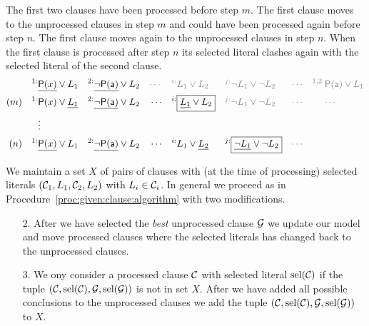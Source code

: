 \begin{example}[InstGen]
	The first two clauses have been processed before step \( m \).
	The first clause moves to the unprocessed clauses in step \( m \)
	and could have been processed again before step \( n \).
	The first clause moves again to the unprocessed clauses in step \( n \).
When the first clause is processed after step \(n \)
its selected literal clashes again with the selected literal of
the second clause.
\begin{align*}
	^{1:}&\underline{\mP(x)}\lor L_1
	&^{2:}&\underline{\lnot\mP(\ma)}\lor L_2
	&&\textcolor{colG}{\cdots}
	&\textcolor{colG}{^{i:}}&\textcolor{colG}{L_1\lor L_2}
	&\textcolor{colG}{^{j:}}&\textcolor{colG}{\lnot L_1\lor\lnot L_2}
	&&\textcolor{colG}{\cdots}
	&\textcolor{colG}{^{1,2:}}&\textcolor{colG}{\mP(\ma)\lor L_1}
	\\
	(m)\quad
	^{1:}&\mP(x)\lor \underline{L_1}
	&^{2:}&\underline{\lnot\mP(\ma)}\lor L_2
	&&\cdots
	&^{i:}&\boxed{\underline{L_1}\lor L_2}
	&\textcolor{colG}{^{j:}}&\textcolor{colG}{\lnot L_1\lor\lnot L_2}
	&&\textcolor{colG}{\cdots}
	&&\textcolor{colG}{\cdots}
	\\
	&\vdots
	\\
	(n)\quad
	^{1:}&\underline{\mP(x)}\lor {L_1} &
	^{2:}&\underline{\lnot\mP(\ma)}\lor L_2 &
	&\cdots&
	^{i:}&{L_1}\lor \underline{L_2} &
	^{j:}&\boxed{\underline{\lnot L_1}\lor \lnot L_2} &
	&\textcolor{colG}{\cdots}
\end{align*}
\end{example}

\begin{procedure}
	We maintain a set \( X \) of pairs of clauses with (at the time of processing) selected literals
	\( (\mathcal{C}_1, L_1, \mathcal{C}_2, L_2) \) with \( L_i\in\mathcal{C}_i \).
	In general we proceed as in Procedure~\vref{proc:given:clause:algorithm}
	with two modifications.

	\begin{enumerate}
		\item[2.]
		After we have selected the \emph{best} unprocessed clause \( \mathcal{G} \)
		we update our model and move processed clauses where the selected literals has changed back to the unprocessed clauses.
		\item[3.]
		We ony consider a processed clause \( \mathcal{C} \)
		with selected literal \( \operatorname{sel}(\mathcal{C}) \)
		if the tuple \( ( \mathcal{C}, \operatorname{sel}(\mathcal{C}), \mathcal{G}, \operatorname{sel}(\mathcal{G}) ) \)
		is not in set \( X \).
		After we have added all possible conclusions
		to the unprocessed clauses we add
		the tuple \( ( \mathcal{C}, \operatorname{sel}(\mathcal{C}), \mathcal{G}, \operatorname{sel}(\mathcal{G}) ) \) to \( X \).

	\end{enumerate}



\end{procedure}



